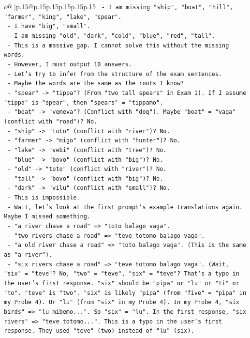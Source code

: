 \documentclass{article}
\begin{document}
{\begin{supertabular}{c@{$\;$}|p{.15\linewidth}@{}p{.15\linewidth}p{.15\linewidth}p{.15\linewidth}p{.15\linewidth}p{.15\linewidth}}
{{{\texttt{  {-} I am missing "ship", "boat", "hill", "farmer", "king", "lake", "spear".} \\
\texttt{  {-} I have "big", "small".} \\
\texttt{  {-} I am missing "old", "dark", "cold", "blue", "red", "tall".} \\
\texttt{  {-} This is a massive gap. I cannot solve this without the missing words.} \\
\texttt{  {-} However, I must output 10 answers.} \\
\texttt{  {-} Let's try to infer from the structure of the exam sentences.} \\
\texttt{  {-} Maybe the words are the same as the roots I know?} \\
\texttt{  {-} "spear" {-}> "tippa"? (From "two tall spears" in Exam 1). If I assume "tippa" is "spear", then "spears" = "tippamo".} \\
\texttt{  {-} "boat" {-}> "vemeva"? (Conflict with "dog"). Maybe "boat" = "vaga" (conflict with "road")? No.} \\
\texttt{  {-} "ship" {-}> "toto" (conflict with "river")? No.} \\
\texttt{  {-} "farmer" {-}> "migo" (conflict with "hunter")? No.} \\
\texttt{  {-} "lake" {-}> "vebi" (conflict with "tree")? No.} \\
\texttt{  {-} "blue" {-}> "bovo" (conflict with "big")? No.} \\
\texttt{  {-} "old" {-}> "toto" (conflict with "river")? No.} \\
\texttt{  {-} "tall" {-}> "bovo" (conflict with "big")? No.} \\
\texttt{  {-} "dark" {-}> "vilu" (conflict with "small")? No.} \\
\texttt{  {-} This is impossible.} \\
\texttt{  {-} Wait, let's look at the first prompt's example translations again. Maybe I missed something.} \\
\texttt{  {-} "a river chase a road" => "toto balago vaga".} \\
\texttt{  {-} "two rivers chase a road" => "teve totomo balago vaga".} \\
\texttt{  {-} "a old river chase a road" => "toto balago vaga". (This is the same as "a river").} \\
\texttt{  {-} "six rivers chase a road" => "teve totomo balago vaga". (Wait, "six" = "teve"? No, "two" = "teve", "six" = "teve"? That's a typo in the user's first response. "six" should be "pipa" or "lu" or "ti" or "to". "teve" is "two". "six" is likely "pipa" (from "five" = "pipa" in my Probe 4). Or "lu" (from "six" in my Probe 4). In my Probe 4, "six birds" => "lu mibemo...". So "six" = "lu". In the first response, "six rivers" => "teve totomo...". This is a typo in the user's first response. They used "teve" (two) instead of "lu" (six).} \\
}}}
\end{supertabular}}
\end{document}
